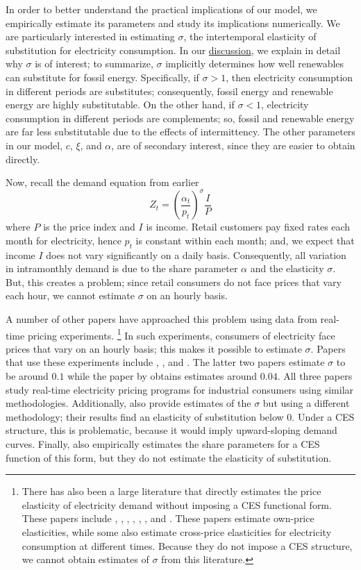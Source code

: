\documentclass[11pt,a4paper,leqno]{extarticle}
\begin{document}
	In order to better understand the practical implications of our model, we empirically estimate its parameters and study its implications numerically. We are particularly interested in estimating $\sigma$, the intertemporal elasticity of substitution for electricity consumption. In our  \hyperref[sec:Discussion]{discussion}, we explain in detail why $\sigma$ is of interest; to summarize, $\sigma$ implicitly determines how well renewables can substitute for fossil energy. Specifically, if $\sigma > 1$, then electricity consumption in different periods are substitutes; consequently, fossil energy and renewable energy are highly substitutable. On the other hand, if $\sigma< 1$, electricity consumption in different periods are complements; so, fossil and renewable energy are far less substitutable due to the effects of intermittency. The other parameters in our model, $c$,  $\xi$, and $\alpha$, are of secondary interest, since they are easier to obtain directly. 
	
	Now, recall the demand equation from earlier
	$$Z_t = \left(\frac{\alpha_t}{p_t} \right)^\sigma \frac{I}{P}$$
	where $P$ is the price index and $I$ is income. Retail customers pay fixed rates each month for electricity, hence $p_t$ is constant within each month; and, we expect that income $I$ does not vary significantly on a daily basis. Consequently, all variation in intramonthly demand is due to the share parameter $\alpha$ and the elasticity $\sigma$. But, this creates a problem; since retail consumers do not face prices that vary each hour, we cannot estimate  $\sigma$ on an hourly basis. 
	
	A number of other papers have approached this problem using data from real-time pricing experiments.
	\footnote{ There has also been a large literature that directly estimates the price elasticity of electricity demand without imposing a CES functional form. These papers include \citet{Wolak}, \citet{Zarnikau}, \citet{Woo}, \citet{Zhou}, \citet{Reiss}, \citet{Fan}, and \citet{Deryugina}. These papers estimate own-price elasticities, while some also estimate cross-price elasticities for electricity consumption at different times. Because they do not impose a CES structure, we cannot obtain estimates of $\sigma$ from this literature. } In such experiments, consumers of electricity face prices that vary on an hourly basis; this makes it possible to estimate $\sigma$. Papers that use these experiments include \citet{Schwarz}, \citet{Herriges}, and \citet{KS1994}.
	The latter two papers estimate $\sigma$ to be around $0.1$ while the paper by \citeauthor{Schwarz}  obtains estimates around $0.04$. All three papers study real-time electricity pricing programs for industrial consumers using similar methodologies. Additionally, \citet{Aubin} also provide estimates of the $\sigma$ but using a different methodology; their results find an elasticity of substitution below 0. Under a CES structure, this is problematic, because it would imply upward-sloping demand curves. Finally, \citet{Moha2016} also empirically estimates the share parameters for a CES function of this form, but they do not estimate the elasticity of substitution. 
	
\end{document}
